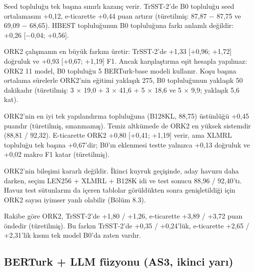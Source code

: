 \documentclass[11pt]{article}
\begin{document}
Seed topluluğu tek başına sınırlı kazanç verir. TrSST-2'de B0 topluluğu seed ortalamasını +0,12, e-ticarette +0,44 puan artırır (türetilmiş: 87,87 $-$ 87,75 ve 69,09 $-$ 68,65). HBEST topluluğunun B0 topluluğuna farkı anlamlı değildir: +0,26 [$-$0,04; +0,56].

ORK2 çalışmanın en büyük farkını üretir: TrSST-2'de +1,33 [+0,96; +1,72] doğruluk ve +0,93 [+0,67; +1,19] F1. Ancak karşılaştırma eşit hesapla yapılmaz: ORK2 11 model, B0 topluluğu 5 BERTurk-base modeli kullanır. Koşu başına ortalama sürelerle ORK2'nin eğitimi yaklaşık 275, B0 topluluğunun yaklaşık 50 dakikadır (türetilmiş: 3 $\times$ 19,0 + 3 $\times$ 41,6 + 5 $\times$ 18,6 ve 5 $\times$ 9,9; yaklaşık 5,6 kat).

ORK2'nin en iyi tek yapılandırma topluluğuna (B128KL, 88,75) üstünlüğü +0,45 puandır (türetilmiş, sınanmamış). Temiz altkümede de ORK2 en yüksek sistemdir (88,81 / 92,32). E-ticarette ORK2 +0,80 [+0,41; +1,19] verir, ama XLMRL topluluğu tek başına +0,67'dir; B0'ın eklenmesi testte yalnızca +0,13 doğruluk ve +0,02 makro F1 katar (türetilmiş).

ORK2'nin bileşimi kararlı değildir. İkinci kuyruk geçişinde, aday havuzu daha darken, seçim LEN256 + XLMRL + B128K idi ve test sonucu 88,96 / 92,40'tı. Havuz test sütunlarını da içeren tablolar görüldükten sonra genişletildiği için ORK2 sayısı iyimser yanlı olabilir (Bölüm 8.3).

Rakibe göre ORK2, TrSST-2'de +1,80 / +1,26, e-ticarette +3,89 / +3,72 puan öndedir (türetilmiş). Bu farkın TrSST-2'de +0,35 / +0,24'lük, e-ticarette +2,65 / +2,31'lik kısmı tek model B0'da zaten vardır.

\subsection{BERTurk + LLM füzyonu (AS3, ikinci yarı)}
\end{document}
